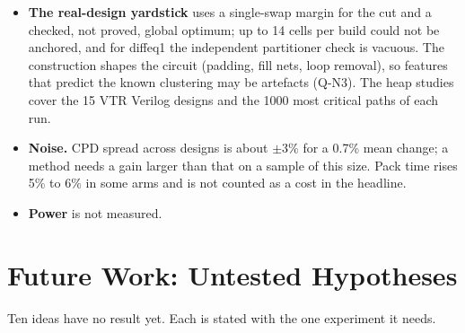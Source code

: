 \begin{itemize}
\item \textbf{The real-design yardstick} uses a single-swap margin for the cut and a checked, not proved, global optimum; up to 14 cells per build could not be anchored, and for diffeq1 the independent partitioner check is vacuous. The construction shapes the circuit (padding, fill nets, loop removal), so features that predict the known clustering may be artefacts (Q-N3). The heap studies cover the 15 VTR Verilog designs and the 1000 most critical paths of each run.
\item \textbf{Noise.} CPD spread across designs is about $\pm 3\%$ for a 0.7\% mean change; a method needs a gain larger than that on a sample of this size. Pack time rises 5\% to 6\% in some arms and is not counted as a cost in the headline.
\item \textbf{Power} is not measured.
\end{itemize}

\section{Future Work: Untested Hypotheses}
\label{sec:future}

Ten ideas have no result yet. Each is stated with the one experiment it needs.


